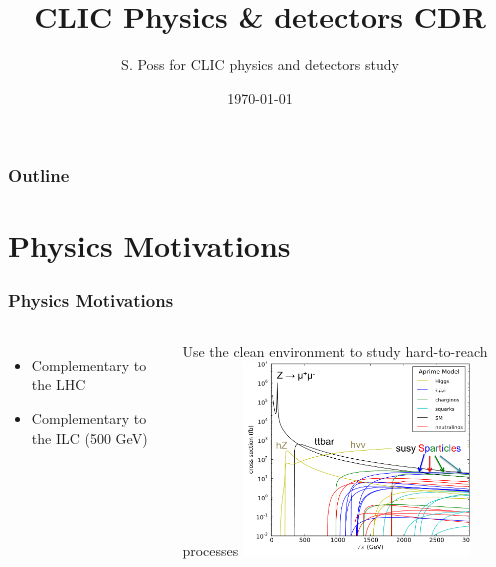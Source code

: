 \documentclass{beamer}
\author{S. Poss for CLIC physics and detectors study}
\institute[CERN]{CERN}
\title[]{CLIC Physics \& detectors CDR}
\date{\today}
\begin{document}
{

\begin{frame}
	\titlepage
\end{frame}

\begin{frame}
\frametitle{Outline}
\tableofcontents
\end{frame}
}

\section{Physics Motivations}
\begin{frame}
\frametitle{Physics Motivations}
\begin{columns}[c]
\column{6cm}
\begin{itemize} 
  \item Complementary to the LHC
  \item Complementary to the ILC (500 GeV)
\end{itemize}
Use the clean environment to study hard-to-reach processes
\column{6cm}
\includegraphics[width=6cm]{models}
\end{columns}
\end{frame}
\end{document}
